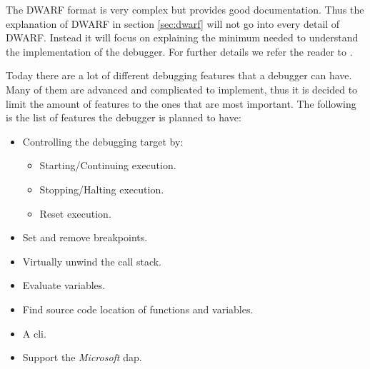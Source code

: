 The \gls{DWARF} format is very complex but provides good documentation.
Thus the explanation of \gls{DWARF} in section \ref{sec:dwarf} will not go into every detail of \gls{DWARF}.
Instead it will focus on explaining the minimum needed to understand the implementation of the debugger.
For further details we refer the reader to \cite{dwarf}.


Today there are a lot of different debugging features that a debugger can have.
Many of them are advanced and complicated to implement, thus it is decided to limit the amount of features to the ones that are most important.
The following is the list of features the debugger is planned to have:

\begin{itemize}
  \item Controlling the debugging target by:
  \begin{itemize}
    \item Starting/Continuing execution.
    \item Stopping/Halting execution.
    \item Reset execution.
  \end{itemize}
  \item Set and remove breakpoints.
  \item Virtually unwind the call stack.
  \item Evaluate variables.
  \item Find source code location of functions and variables.
  \item A \acrfull{cli}.
  \item Support the \emph{Microsoft} \acrfull{dap}.
\end{itemize}




